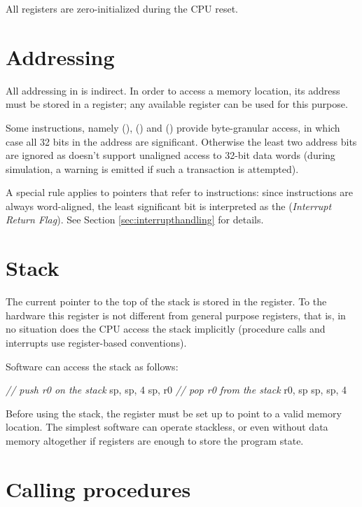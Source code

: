 \documentclass[a4paper,12pt,twoside,extrafontsizes]{memoir}
\begin{document}
All registers are zero-initialized during the CPU reset.

\section{Addressing}
\label{sec:addressing}

All addressing in \lxp{} is indirect. In order to access a memory location, its address must be stored in a register; any available register can be used for this purpose.

Some instructions, namely  (),  () and  () provide byte-granular access, in which case all 32 bits in the address are significant. Otherwise the least two address bits are ignored as \lxp{} doesn't support unaligned access to 32-bit data words (during simulation, a warning is emitted if such a transaction is attempted).

A special rule applies to pointers that refer to instructions: since instructions are always word-aligned, the least significant bit is interpreted as the  (\emph{Interrupt Return Flag}). See Section \ref{sec:interrupthandling} for details.

\section{Stack}
\label{sec:stack}

The current pointer to the top of the stack is stored in the  register. To the hardware this register is not different from general purpose registers, that is, in no situation does the CPU access the stack implicitly (procedure calls and interrupts use register-based conventions).

Software can access the stack as follows:

\begin{codepar}
    \emph{// push r0 on the stack}
     sp, sp, 4
     sp, r0
    \emph{// pop r0 from the stack}
     r0, sp
     sp, sp, 4
\end{codepar}

Before using the stack, the  register must be set up to point to a valid memory location. The simplest software can operate stackless, or even without data memory altogether if registers are enough to store the program state.

\section{Calling procedures}
\label{sec:callingprocedures}
\end{document}
